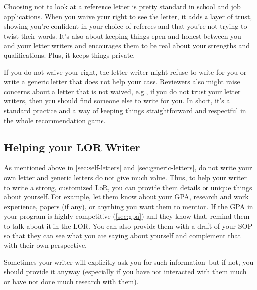 \documentclass[oneside,11pt,dvipsnames]{book}
\begin{document}
Choosing not to look at a reference letter is pretty standard in school and job applications. When you waive your right to see the letter, it adds a layer of trust, showing you're confident in your choice of referees and that you're not trying to twist their words. It's also about keeping things open and honest between you and your letter writers and encourages them to be real about your strengths and qualifications. Plus, it keeps things private.

If you do not waive your right,  the letter writer might refuse to write for you or write a generic letter that does not help your case.  Reviewers also might raise concerns about a letter that is not waived, e.g., if you do not trust your letter writers, then you should find someone else to write for you. In short, it's a standard practice and a way of keeping things straightforward and respectful in the whole recommendation game.





\subsection{Helping your LOR Writer}\label{sec:help-your-LOR-writers}

 As mentioned above in \autoref{sec:self-letters} and \autoref{sec:generic-letters}, do not write your own letter and generic letters do not give much value. Thus, to help your writer to write a strong, customized LoR, you can provide them details or unique things about yourself. For example, let them know about your GPA, research and work experience, papers (if any), or anything you want them to mention.  If the GPA in your program is highly competitive (\autoref{sec:gpa}) and they know that, remind them to talk about it in the LOR. 
You can also provide them with a draft of your SOP so that they can see what you are saying about yourself and complement that with their own perspective.

Sometimes your writer will explicitly ask you for such information, but if not, you should provide it anyway (especially if you have not interacted with them much or have not done much research with them).
\end{document}
